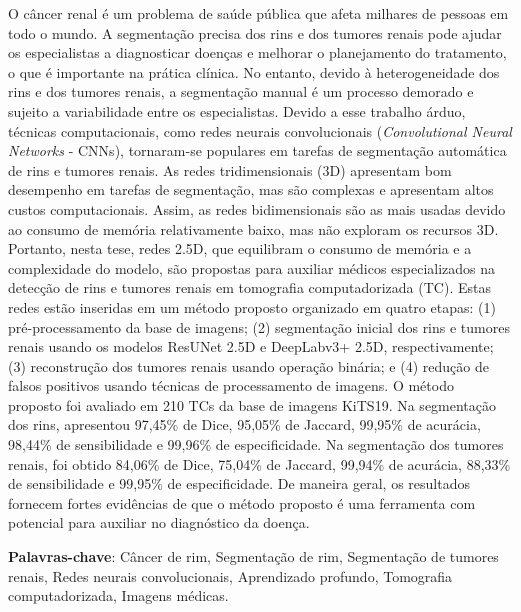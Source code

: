 \begin{resumo}
O câncer renal é um problema de saúde pública que afeta milhares de pessoas em todo o mundo. A segmentação precisa dos rins e dos tumores renais pode ajudar os especialistas a diagnosticar doenças e melhorar o planejamento do tratamento, o que é importante na prática clínica. No entanto, devido à heterogeneidade dos rins e dos tumores renais, a segmentação manual é um processo demorado e sujeito a variabilidade entre os especialistas. Devido a esse trabalho árduo, técnicas computacionais, como redes neurais convolucionais (\textit{Convolutional Neural Networks} - CNNs), tornaram-se populares em tarefas de segmentação automática de rins e tumores renais. As redes tridimensionais (3D) apresentam bom desempenho em tarefas de segmentação, mas são complexas e apresentam altos custos computacionais. Assim, as redes bidimensionais são as mais usadas devido ao consumo de memória relativamente baixo, mas não exploram os recursos 3D. Portanto, nesta tese, redes 2.5D, que equilibram o consumo de memória e a complexidade do modelo, são propostas para auxiliar médicos especializados na detecção de rins e tumores renais em tomografia computadorizada (TC). Estas redes estão inseridas em um método proposto organizado em quatro etapas: (1) pré-processamento da base de imagens; (2) segmentação inicial dos rins e tumores renais usando os modelos ResUNet 2.5D e DeepLabv3+ 2.5D, respectivamente; (3) reconstrução dos tumores renais usando operação binária; e (4) redução de falsos positivos usando técnicas de processamento de imagens. O método proposto foi avaliado em 210 TCs da base de imagens KiTS19. Na segmentação dos rins, apresentou 97,45\% de Dice, 95,05\% de Jaccard, 99,95\% de acurácia, 98,44\% de sensibilidade e 99,96\% de especificidade. Na segmentação dos tumores renais, foi obtido 84,06\% de Dice, 75,04\% de Jaccard, 99,94\% de acurácia, 88,33\% de sensibilidade e 99,95\% de especificidade. De maneira geral, os resultados fornecem fortes evidências de que o método proposto é uma ferramenta com potencial para auxiliar no diagnóstico da doença.

\textbf{Palavras-chave}: {Câncer de rim, Segmentação de rim, Segmentação de tumores renais, Redes neurais convolucionais, Aprendizado profundo, Tomografia computadorizada, Imagens médicas}. 
\end{resumo}
